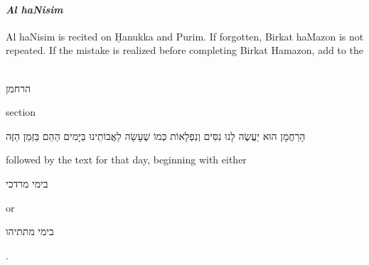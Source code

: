 \documentclass[11pt]{article}
\newcommand{\hebword}[1]{‎\begin{hebrew}\beginR #1 \endR\end{hebrew}}
\begin{document}
\paragraph{\textit{Al haNisim}}

Al haNisim is recited on \d{H}anukka and Purim.  If forgotten, Birkat haMazon is not repeated.  If the mistake is realized before completing Birkat Hamazon, add to the \hebword{הרחמן} section \hebword{הָרַחֲמָן הוּא יַעֲשֶׂה לָנוּ נִסִּים וְנִפְלָאוֹת כְּמוֹ שֶׁעָשָׂה לַאֲבוֹתֵינוּ בַּיָּמִים הַהֵם בַּזְּמַן הַזֶּה} followed by the text for that day, beginning with either \hebword{בימי מרדכי} or \hebword{בימי מתתיהו} \parencite*[44:16]{Kitzur}.

%
%
%
%
%



\printbibliography
\end{document}
